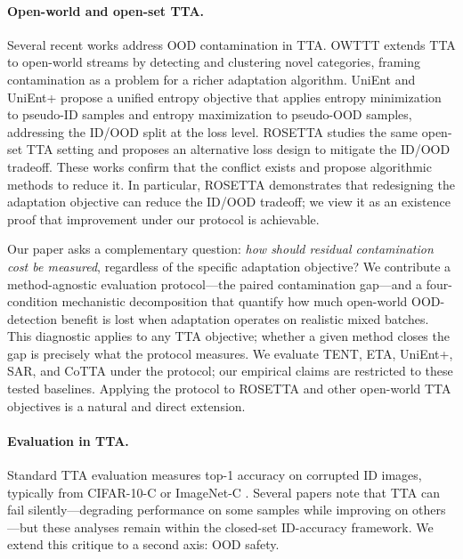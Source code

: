 \paragraph{Open-world and open-set TTA.}
Several recent works address OOD contamination in TTA.
OWTTT \citep{owttt} extends TTA to open-world streams by detecting and clustering novel categories, framing contamination as a problem for a richer adaptation algorithm.
UniEnt and UniEnt+ \citep{unient} propose a unified entropy objective that applies entropy minimization to pseudo-ID samples and entropy maximization to pseudo-OOD samples, addressing the ID/OOD split at the loss level.
ROSETTA \citep{rosetta} studies the same open-set TTA setting and proposes an alternative loss design to mitigate the ID/OOD tradeoff.
These works confirm that the conflict exists and propose algorithmic methods to reduce it.
In particular, ROSETTA demonstrates that redesigning the adaptation objective can reduce the ID/OOD tradeoff; we view it as an existence proof that improvement under our protocol is achievable.

Our paper asks a complementary question: \emph{how should residual contamination cost be measured}, regardless of the specific adaptation objective?
We contribute a method-agnostic evaluation protocol---the paired contamination gap---and a four-condition mechanistic decomposition that quantify how much open-world OOD-detection benefit is lost when adaptation operates on realistic mixed batches.
This diagnostic applies to any TTA objective; whether a given method closes the gap is precisely what the protocol measures.
We evaluate TENT, ETA, UniEnt+, SAR, and CoTTA under the protocol; our empirical claims are restricted to these tested baselines.
Applying the protocol to ROSETTA and other open-world TTA objectives is a natural and direct extension.

\paragraph{Evaluation in TTA.}
Standard TTA evaluation measures top-1 accuracy on corrupted ID images, typically from CIFAR-10-C \citep{imagenetc} or ImageNet-C \citep{imagenetc}.
Several papers note that TTA can fail silently---degrading performance on some samples while improving on others \citep{cotta,sar}---but these analyses remain within the closed-set ID-accuracy framework.
We extend this critique to a second axis: OOD safety.
